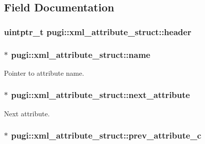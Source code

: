 \subsection{Field Documentation}
\hypertarget{structpugi_1_1xml__attribute__struct_a0dca6ca6c129bbf87a7ebaf87f3e12de}{
\subsubsection[{header}]{\setlength{\rightskip}{0pt plus 5cm}uintptr\-\_\-t pugi\-::xml\-\_\-attribute\-\_\-struct\-::header}}\label{structpugi_1_1xml__attribute__struct_a0dca6ca6c129bbf87a7ebaf87f3e12de}
\hypertarget{structpugi_1_1xml__attribute__struct_aa886c4aae23a132e1704717721ee2c19}{
\subsubsection[{name}]{$\ast$ pugi\-::xml\-\_\-attribute\-\_\-struct\-::name}}\label{structpugi_1_1xml__attribute__struct_aa886c4aae23a132e1704717721ee2c19}


Pointer to attribute name. 

\hypertarget{structpugi_1_1xml__attribute__struct_a9860c0eb7fa72dc9b69ee9b0575f9efc}{
\subsubsection[{next\-\_\-attribute}]{$\ast$ pugi\-::xml\-\_\-attribute\-\_\-struct\-::next\-\_\-attribute}}\label{structpugi_1_1xml__attribute__struct_a9860c0eb7fa72dc9b69ee9b0575f9efc}


Next attribute. 

\hypertarget{structpugi_1_1xml__attribute__struct_a0e3a022235b316e4cfc1034ceb7d7862}{
\subsubsection[{prev\-\_\-attribute\-\_\-c}]{$\ast$ pugi\-::xml\-\_\-attribute\-\_\-struct\-::prev\-\_\-attribute\-\_\-c}}\label{structpugi_1_1xml__attribute__struct_a0e3a022235b316e4cfc1034ceb7d7862}


